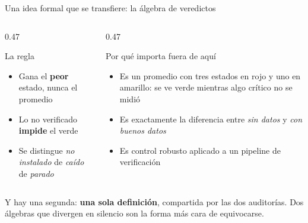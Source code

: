 \documentclass[aspectratio=169,11pt]{beamer}
\begin{document}
\begin{frame}{Una idea formal que se transfiere: la álgebra de veredictos}
  \begin{columns}[T]
    \begin{column}{0.47\textwidth}
      \begin{alertblock}{La regla}
        \begin{itemize}
          \item Gana el \textbf{peor} estado, nunca el promedio
          \item Lo no verificado \textbf{impide} el verde
          \item Se distingue \emph{no instalado} de \emph{caído} de \emph{parado}
        \end{itemize}
      \end{alertblock}
    \end{column}
    \begin{column}{0.47\textwidth}
      \begin{exampleblock}{Por qué importa fuera de aquí}
        \begin{itemize}
          \item Es un promedio con tres estados en rojo y uno en amarillo: se
                ve verde mientras algo crítico no se midió
          \item Es exactamente la diferencia entre \emph{sin datos} y
                \emph{con buenos datos}
          \item Es control robusto aplicado a un pipeline de verificación
        \end{itemize}
      \end{exampleblock}
    \end{column}
  \end{columns}
  \begin{panelRegla}
    Y hay una segunda: \textbf{una sola definición}, compartida por las dos
    auditorías. Dos álgebras que divergen en silencio son la forma más cara de
    equivocarse.
  \end{panelRegla}
\end{frame}
\end{document}

